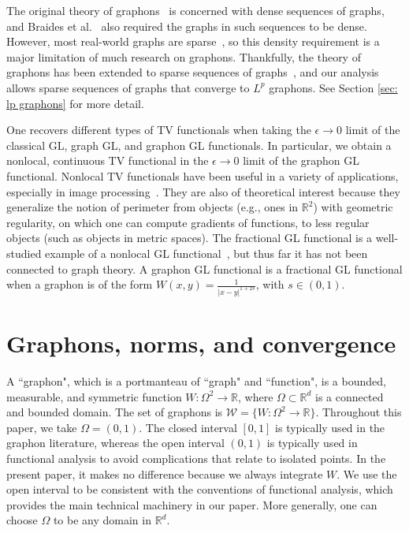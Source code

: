 \documentclass[11pt]{amsart}
\def\R{\mathbb{R}}
\def\ep{\epsilon}
\def\ra{\rightarrow}
\numberwithin{equation}{section}
\begin{document}
The original theory of graphons~\cite{lovasz2012large} {is concerned with} dense sequences of graphs, and Braides et al.~\cite{braides2020cut} also required the graphs in such sequences to be dense. However, most real-world graphs are sparse~\cite{newman2018, bollobas2007metrics}, so this density requirement is a major limitation of much research on graphons. Thankfully, the theory of graphons has been extended to {sparse sequences of graphs}~\cite{borgs2019LpI, borgs2018LpII}, and our analysis allows sparse sequences of graphs that converge to $L^p$ graphons. See Section \ref{sec: lp graphons} for more detail.

One recovers different types of TV functionals when taking the $\ep \ra 0$ limit of the classical GL, graph GL, and graphon GL functionals. In particular, we obtain a nonlocal, continuous TV functional in the $\ep \ra 0$ limit of the graphon GL {functional}. 
Nonlocal TV functionals have been useful in a variety of applications, especially in image processing~\cite{caffarelli2009nonlocal, elbouchairi2023nonlocal, gilboa2009nonlocal, liu2014new, lou2010image, arias2012nonlocal, aujol2015fundamentals, el2014mean, hafiene2018nonlocal}. They are also of theoretical interest because they generalize the notion of perimeter {from objects (e.g., ones in $\R^2$) with geometric regularity, on which one can compute gradients of functions, to less regular objects (such as objects in metric spaces)\cite{mazon2019nonlocal}.} 
The fractional GL functional is a well-studied example of a nonlocal GL functional~\cite{savin2012gamma, tarasov2005fractional, pu2013well}, but thus far it has not been connected to graph theory. 
A graphon GL {functional} is a fractional GL {functional} when a graphon is of the form $W(x,y) = \frac{1}{|x - y|^{1 + 2s}}$, with $s \in (0,1)$.



\section{Graphons, norms, and convergence}\label{sec: graphons} 

A ``graphon", which is a portmanteau of ``graph" and ``function", is a bounded, measurable, and symmetric function $W: \Omega^2 \ra \R$, where $\Omega \subset \R^d$ is a {connected and bounded} domain. The set of graphons is ${\mathcal{W}} = \{ W: \Omega^2 \ra \R\}$. Throughout this paper, we take $\Omega = (0,1)$. The closed interval $[0,1]$ is typically used in the graphon literature, whereas the  open interval $(0,1)$ is typically used in functional analysis {{to} avoid complications that relate to
isolated points. In the present paper, it makes no difference because {we always integrate $W$.}} We use the open interval to be consistent with the conventions of functional analysis, which provides the main technical machinery in our paper. More generally, one can choose $\Omega$ to be any domain in $\R^d$. 
\end{document}
